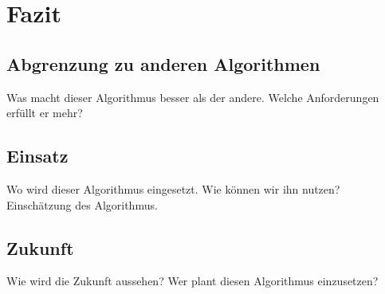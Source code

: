 \section{Fazit}
\label{sec:Fazit}


\subsection{Abgrenzung zu anderen Algorithmen} 
\label{sec:abgrenzung}
Was macht dieser Algorithmus besser als der andere.
Welche Anforderungen erfüllt er mehr?


\subsection{Einsatz} 
\label{sec:einsatz}
Wo wird dieser Algorithmus eingesetzt. Wie können wir ihn nutzen? 
Einschätzung des Algorithmus.

\subsection{Zukunft} 
\label{sec:zukunft}
Wie wird die Zukunft aussehen?
Wer plant diesen Algorithmus einzusetzen?






